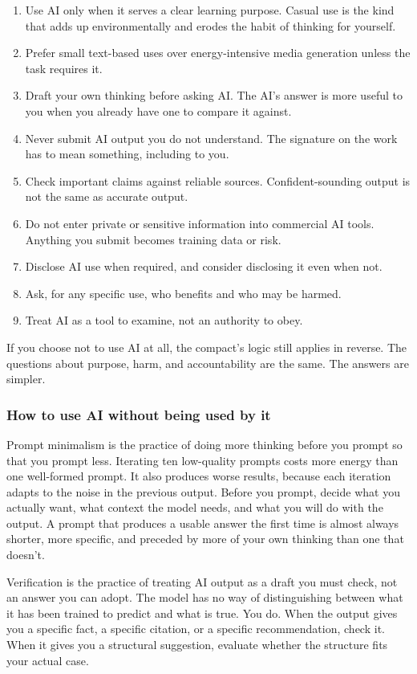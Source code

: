 \documentclass[12pt]{article}
\begin{document}
\begin{enumerate}
\item Use AI only when it serves a clear learning purpose. Casual use is the kind that adds up environmentally and erodes the habit of thinking for yourself.
\item Prefer small text-based uses over energy-intensive media generation unless the task requires it.
\item Draft your own thinking before asking AI. The AI's answer is more useful to you when you already have one to compare it against.
\item Never submit AI output you do not understand. The signature on the work has to mean something, including to you.
\item Check important claims against reliable sources. Confident-sounding output is not the same as accurate output.
\item Do not enter private or sensitive information into commercial AI tools. Anything you submit becomes training data or risk.
\item Disclose AI use when required, and consider disclosing it even when not.
\item Ask, for any specific use, who benefits and who may be harmed.
\item Treat AI as a tool to examine, not an authority to obey.
\end{enumerate}

If you choose not to use AI at all, the compact's logic still applies in reverse. The questions about purpose, harm, and accountability are the same. The answers are simpler.

\subsubsection*{How to use AI without being used by it}

Prompt minimalism is the practice of doing more thinking before you prompt so that you prompt less. Iterating ten low-quality prompts costs more energy than one well-formed prompt. It also produces worse results, because each iteration adapts to the noise in the previous output. Before you prompt, decide what you actually want, what context the model needs, and what you will do with the output. A prompt that produces a usable answer the first time is almost always shorter, more specific, and preceded by more of your own thinking than one that doesn't.

Verification is the practice of treating AI output as a draft you must check, not an answer you can adopt. The model has no way of distinguishing between what it has been trained to predict and what is true. You do. When the output gives you a specific fact, a specific citation, or a specific recommendation, check it. When it gives you a structural suggestion, evaluate whether the structure fits your actual case.
\end{document}
